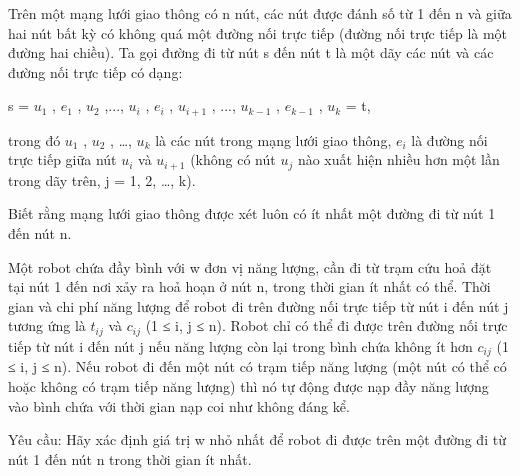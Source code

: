 Trên một mạng lưới giao thông có n nút, các nút được đánh số từ 1 đến n và giữa hai nút bất kỳ có không quá một đường nối trực tiếp (đường nối trực tiếp là một đường hai chiều). Ta gọi đường đi từ nút s đến nút t là một dãy các nút và các đường nối trực tiếp có dạng:

s = $u_{1}$ , $e_{1}$ , $u_{2}$ ,..., $u_{i}$ , $e_{i}$ , $u_{i+1}$ , ..., $u_{k-1}$ , $e_{k-1}$ , $u_{k}$ = t,

trong đó $u_{1}$ , $u_{2}$ , …, $u_{k}$ là các nút trong mạng lưới giao thông, $e_{i}$ là đường nối trực tiếp giữa nút $u_{i}$ và $u_{i+1}$ (không có nút $u_{j}$ nào xuất hiện nhiều hơn một lần trong dãy trên, j = 1, 2, …, k).

Biết rằng mạng lưới giao thông được xét luôn có ít nhất một đường đi từ nút 1 đến nút n.

Một robot chứa đầy bình với w đơn vị năng lượng, cần đi từ trạm cứu hoả đặt tại nút 1 đến nơi xảy ra hoả hoạn ở nút n, trong thời gian ít nhất có thể. Thời gian và chi phí năng lượng để robot đi trên đường nối trực tiếp từ nút i đến nút j tương ứng là $t_{ij}$ và $c_{ij}$ (1 ≤ i, j ≤ n). Robot chỉ có thể đi được trên đường nối trực tiếp từ nút i đến nút j nếu năng lượng còn lại trong bình chứa không ít hơn $c_{ij}$ (1 ≤ i, j ≤ n). Nếu robot đi đến một nút có trạm tiếp năng lượng (một nút có thể có hoặc không có trạm tiếp năng lượng) thì nó tự động được nạp đầy năng lượng vào bình chứa với thời gian nạp coi như không đáng kể.

Yêu cầu: Hãy xác định giá trị w nhỏ nhất để robot đi được trên một đường đi từ nút 1 đến nút n trong thời gian ít nhất.
